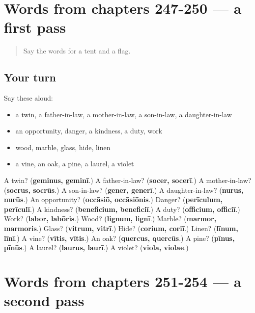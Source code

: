 \section[(dialogue)]{Words from chapters 247-250 — a first pass}

\label{lesson:LA-R254-first-pass-words-from-chapters-247-250}



\begin{quote}
Say the words for a tent and a flag.
\end{quote}

\subsection*{Your turn}
Say these aloud:

\begin{itemize}
\raggedright
  \item a twin, a father-in-law, a mother-in-law, a son-in-law, a daughter-in-law
  \item an opportunity, danger, a kindness, a duty, work
  \item wood, marble, glass, hide, linen
  \item a vine, an oak, a pine, a laurel, a violet
\end{itemize}

\begin{tcolorbox}[breakable,colback=teal!4,colframe=teal!35!black,title={Before you move on}]
A twin? (\textbf{geminus, geminī}.) A father-in-law? (\textbf{socer, socerī}.) A mother-in-law? (\textbf{socrus, socrūs}.) A son-in-law? (\textbf{gener, generī}.) A daughter-in-law? (\textbf{nurus, nurūs}.) An opportunity? (\textbf{occāsiō, occāsiōnis}.) Danger? (\textbf{perīculum, perīculī}.) A kindness? (\textbf{beneficium, beneficiī}.) A duty? (\textbf{officium, officiī}.) Work? (\textbf{labor, labōris}.) Wood? (\textbf{lignum, lignī}.) Marble? (\textbf{marmor, marmoris}.) Glass? (\textbf{vitrum, vitrī}.) Hide? (\textbf{corium, coriī}.) Linen? (\textbf{līnum, līnī}.) A vine? (\textbf{vītis, vītis}.) An oak? (\textbf{quercus, quercūs}.) A pine? (\textbf{pīnus, pīnūs}.) A laurel? (\textbf{laurus, laurī}.) A violet? (\textbf{viola, violae}.)
\end{tcolorbox}
\section[(dialogue)]{Words from chapters 251-254 — a second pass}

